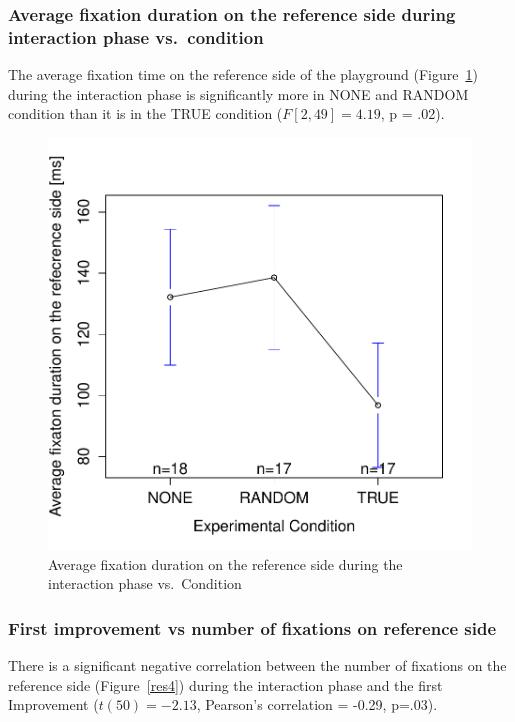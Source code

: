 \documentclass{sig-alternate}
\begin{document}
\subsubsection{Average fixation duration on the reference side during interaction
phase vs.~condition}

The average fixation time on the reference side of the playground
(Figure~\ref{res3}) during the interaction phase is significantly more in {\sf NONE}
and {\sf RANDOM} condition than it is in the {\sf TRUE} condition ($F[2,49]=4.19$,
p = .02).

\begin{figure}[h!]
    \centering
    \includegraphics[width=0.8\linewidth]{meanPlotFixReference}
    \caption{Average fixation duration on the reference side during the
    interaction phase vs.~Condition}
    \label{res3}
\end{figure}

\subsubsection{First improvement vs number of fixations on reference side}

There is a significant negative correlation between the number of
fixations on the reference side (Figure~\ref{res4}) during the interaction phase
and the first Improvement ($t(50)=-2.13$, Pearson's correlation = -0.29, p=.03).
\end{document}
